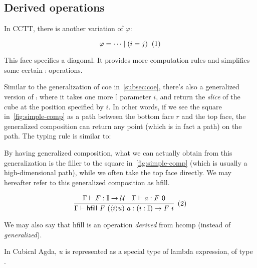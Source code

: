 \subsection{Derived operations}

In CCTT, there is another variation of $\varphi$:

\[
  \varphi = \dots \mid (i = j)
  \xtag
\]

This face specifies a diagonal.
It provides more computation rules and simplifies some certain
$\comp$ operations.

Similar to the generalization of \textsf{coe} in~\cref{subsec:coe},
there's also a generalized version of $\comp$
where it takes one more $\mathbb I$ parameter $i$,
and return the \textit{slice} of the cube at the position
specified by $i$.
In other words, if we see the square in~\cref{fig:simple-comp} as a path
between the bottom face $r$ and the top face,
the generalized composition can return any point (which is in fact a path) on the path.
The typing rule is similar to:

By having generalized composition,
what we can actually obtain from this generalization
is the filler to the square in~\cref{fig:simple-comp}
(which is usually a high-dimensional path),
while we often take the top face directly.
We may hereafter refer to this generalized composition as \textsf{hfill}.

\[
  \cfrac
  {\Gamma \vdash F : \mathbb I \rightarrow \mathcal U \quad
    \Gamma \vdash a : F \ \textsf 0}
  {\Gamma \vdash \textsf{hfill}~F~(\lrangle i u)~a : (i : \mathbb I) \rightarrow F \ i}
  \xtag
\]

We may also say that \textsf{hfill} is an operation \textit{derived} from
\textsf{hcomp} (instead of \textit{generalized}).

In Cubical Agda, $u$ is represented as a special type of lambda expression,
of type .


